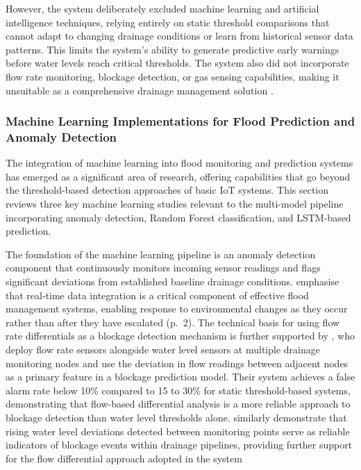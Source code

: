 \documentclass[12pt, a4paper]{article}
\begin{document}
However, the system deliberately excluded machine learning and artificial intelligence techniques, relying entirely on static threshold comparisons that cannot adapt to changing drainage conditions or learn from historical sensor data patterns. This limits the system's ability to generate predictive early warnings before water levels reach critical thresholds. The system also did not incorporate flow rate monitoring, blockage detection, or gas sensing capabilities, making it unsuitable as a comprehensive drainage management solution \citep{kumar2025}.

\subsubsection{Machine Learning Implementations for Flood Prediction and Anomaly Detection}

The integration of machine learning into flood monitoring and prediction systems has emerged as a significant area of research, offering capabilities that go beyond the threshold-based detection approaches of basic IoT systems. This section reviews three key machine learning studies relevant to the multi-model pipeline incorporating anomaly detection, Random Forest classification, and LSTM-based prediction.

The foundation of the machine learning pipeline is an anomaly detection component that continuously monitors incoming sensor readings and flags significant deviations from established baseline drainage conditions. \citet{sathiyamoorthy2025} emphasise that real-time data integration is a critical component of effective flood management systems, enabling response to environmental changes as they occur rather than after they have escalated (p.~2). The technical basis for using flow rate differentials as a blockage detection mechanism is further supported by \citet{ramesh2026}, who deploy flow rate sensors alongside water level sensors at multiple drainage monitoring nodes and use the deviation in flow readings between adjacent nodes as a primary feature in a blockage prediction model. Their system achieves a false alarm rate below 10\% compared to 15 to 30\% for static threshold-based systems, demonstrating that flow-based differential analysis is a more reliable approach to blockage detection than water level thresholds alone. \citet{nagarajan2025} similarly demonstrate that rising water level deviations detected between monitoring points serve as reliable indicators of blockage events within drainage pipelines, providing further support for the flow differential approach adopted in the system 
\end{document}
